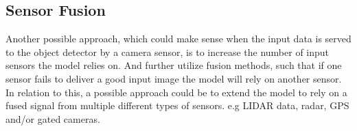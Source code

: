 \documentclass{article}
\begin{document}
\subsection{Sensor Fusion}
Another possible approach, which could make sense when the input data is served to the object detector by a camera sensor, is to increase the number of input sensors the model relies on. And further utilize fusion methods, such that if one sensor fails to deliver a good input image the model will rely on another sensor. In relation to this, a possible approach could be to extend the model to rely on a fused signal from multiple different types of sensors. e.g LIDAR data, radar, GPS and/or gated cameras. 




%


%
%
\end{document}
